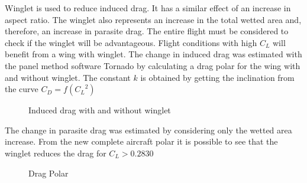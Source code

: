 Winglet is used to reduce induced drag. It has a similar effect of an increase in aspect ratio. The winglet also represents an increase in the total wetted area and, therefore, an increase in parasite drag.
The entire flight must be considered to check if the winglet will be advantageous. Flight conditions with high $C_{L}$ will benefit from a wing with winglet.
The change in induced drag was estimated with the panel method software Tornado by calculating a drag polar for the wing with and without winglet. The constant $k$ is obtained by getting the inclination from the curve $C_{D} = f({C_{L}}^{2})$



\begin{figure}[H] %
\caption{Induced drag with and without winglet}
\label{fig:InducedDrag}
\end{figure}

The change in parasite drag was estimated by considering only the wetted area increase. From the new complete aircraft polar it is possible to see that the winglet reduces the drag for $C_{L} > 0.2830 $


\begin{figure}[H] %
\caption{Drag Polar}
\label{fig:DragPolar}
\end{figure}
